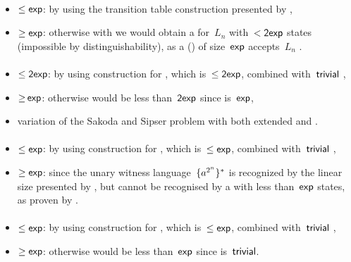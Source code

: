 \paragraph{\ODLA{}\tto\ODFA}\label{cost:1DLAto1DFA}
\begin{itemize}
	\item $\le\Cexp$: by using the transition table construction presented by ,
	\item $\ge\Cexp$: otherwise with \hyperref[cost:1DLAto1DFA]{\ODLA{}\tto\ODFA} we would obtain a \ODFA for~$L_n$ with~$<\Cdexp$ states (impossible by distinguishability), as a \ODLA (\TDFA) of size~$\Cexp$ accepts~$L_n$ \cite{PigPis14}.
\end{itemize}
\paragraph{\OLA{}\tto\ODLA}
\begin{itemize}
	\item $\le\Cdexp$: by using construction for \hyperref[cost:1LAto1DFA]{\OLA{}\tto\ODFA}, which is~$\le\Cdexp$, combined with~$\Ctriv$ \ODFA{}\tto\ODLA,
	\item $\ge\hspacingfix{-1pt}\Cexp$: otherwise \hyperref[cost:1LAto1DFA]{\OLA{}\tto\ODFA} would be less than~$\Cdexp$ since \ODLA{}\tto\ODFA is~$\Cexp$,
	\item variation of the Sakoda and Sipser problem with both extended \TNFA and \TDFA.
\end{itemize}
\paragraph{\ODLA{}\tto\TNFA}\label{cost:1DLAto2NFA}
\begin{itemize}
	\item $\le\Cexp$: by using construction for \hyperref[cost:1DLAto1DFA]{\ODLA{}\tto\ODFA}, which is~$\le\Cexp$, combined with~$\Ctriv$ \ODFA{}\tto\TNFA,
	\item $\ge\Cexp$: since the unary witness language~$\set{a^{2^n}}\star$ is recognized by the linear size \ODLA presented by , but cannot be recognised by a \TNFA with less than~$\Cexp$ states, as proven by .
\end{itemize}
\paragraph{\ODLA{}\tto\ONFA}
\begin{itemize}
	\item $\le\Cexp$: by using construction for \hyperref[cost:1DLAto1DFA]{\ODLA{}\tto\ODFA}, which is~$\le\Cexp$, combined with~$\Ctriv$ \ODFA{}\tto\ONFA,
	\item $\ge\Cexp$: otherwise \hyperref[cost:1DLAto2NFA]{\ODLA{}\tto\TNFA} would be less than~$\Cexp$ since \ONFA{}\tto\TNFA is~$\Ctriv$.
\end{itemize}
